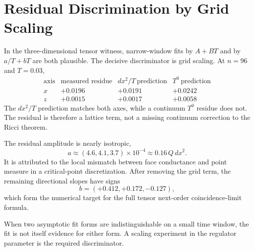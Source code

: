 \section{Residual Discrimination by Grid Scaling}
\label{sec:innovation-input-thermo-verification-residual-discrimination}

\begin{principle}
\label{prin:innovation-input-thermo-scaling-discriminator}
In the three-dimensional tensor witness, narrow-window fits by
$A+BT$ and by $a/T+bT$ are both plausible. The decisive discriminator is
grid scaling. At $n=96$ and $T=0.03$,
$$
\begin{array}{c|c|c|c}
\text{axis} & \text{measured residue}
& dx^2/T\ \text{prediction} & T^0\ \text{prediction}\\
\hline
x & +0.0196 & +0.0191 & +0.0242\\
z & +0.0015 & +0.0017 & +0.0058
\end{array}
$$
The $dx^2/T$ prediction matches both axes, while a continuum $T^0$ residue
does not. The residual is therefore a lattice term, not a missing
continuum correction to the Ricci theorem.
\end{principle}

\begin{principle}
\label{prin:innovation-input-thermo-residual-mechanism}
The residual amplitude is nearly isotropic,
$$
a\approx(4.6,4.1,3.7)\times10^{-4}
\approx
0.16\,Q\,dx^2.
$$
It is attributed to the local mismatch between face conductance and point
measure in a critical-point discretization. After removing the grid term,
the remaining directional slopes have signs
$$
b=(+0.412,+0.172,-0.127),
$$
which form the numerical target for the full tensor next-order
coincidence-limit formula.
\end{principle}

\begin{principle}
\label{prin:innovation-input-thermo-fit-form-discipline}
When two asymptotic fit forms are indistinguishable on a small time
window, the fit is not itself evidence for either form. A scaling
experiment in the regulator parameter is the required discriminator.
\end{principle}


